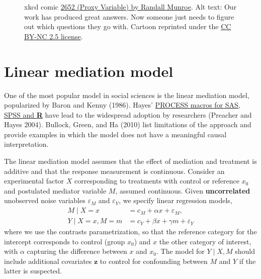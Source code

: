 \documentclass[
  11pt,
  letterpaper,
]{scrbook}
\theoremstyle{definition}
\theoremstyle{definition}
\theoremstyle{remark}
\begin{document}
\begin{figure}[ht!]


\caption{\label{fig-xkcd2652}xkcd comic
\href{https://xkcd.com/2652/}{2652 (Proxy Variable) by Randall Munroe}.
Alt text: Our work has produced great answers. Now someone just needs to
figure out which questions they go with. Cartoon reprinted under the
\href{https://creativecommons.org/licenses/by-nc/2.5/}{CC BY-NC 2.5
license}.}

\end{figure}%

\section{Linear mediation model}\label{linear-mediation-model}

One of the most popular model in social sciences is the linear mediation
model, popularized by Baron and Kenny (1986). Hayes'
\href{https://www.processmacro.org/index.html}{PROCESS macros for SAS,
SPSS and \textbf{R}} have lead to the widespread adoption by researchers
(Preacher and Hayes 2004). Bullock, Green, and Ha (2010) list
limitations of the approach and provide examples in which the model does
not have a meaningful causal interpretation.

The linear mediation model assumes that the effect of mediation and
treatment is additive and that the response measurement is continuous.
Consider an experimental factor \(X\) corresponding to treatments with
control or reference \(x_0\) and postulated mediator variable \(M\),
assumed continuous. Given \textbf{uncorrelated} unobserved noise
variables \(\varepsilon_M\) and \(\varepsilon_Y\), we specify linear
regression models, \begin{align*}
M \mid X=x &= c_M + \alpha x + \varepsilon_M,\\
Y \mid X=x, M=m &=  c_Y + \beta x + \gamma m  + \varepsilon_Y
\end{align*} where we use the contrasts parametrization, so that the
reference category for the intercept corresponds to control (group
\(x_0\)) and \(x\) the other category of interest, with \(\alpha\)
capturing the difference between \(x\) and \(x_0\). The model for
\(Y \mid X, M\) should include additional covariates \(\mathbf{z}\) to
control for confounding between \(M\) and \(Y\) if the latter is
suspected.
\end{document}
